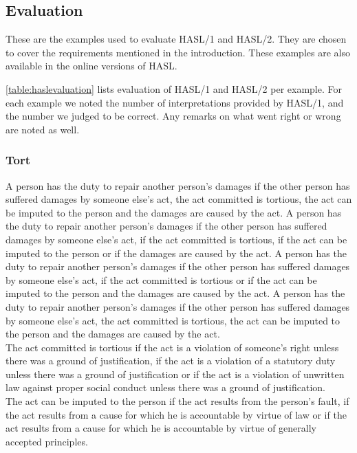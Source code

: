 \subsection{Evaluation}
\label{sec:appevaluation}
These are the examples used to evaluate HASL/1 and HASL/2. They are chosen to cover the requirements mentioned in the introduction. These examples are also available in the online versions of HASL.

\autoref{table:haslevaluation} lists evaluation of HASL/1 and HASL/2 per example. For each example we noted the number of interpretations provided by HASL/1, and the number we judged to be correct. Any remarks on what went right or wrong are noted as well.

\subsubsection{Tort}
\begin{exe}
\ex\label{e126} A person has the duty to repair another person's damages if the other person has suffered damages by someone else's act, the act committed is tortious, the act can be imputed to the person and the damages are caused by the act.
\ex\label{e127} A person has the duty to repair another person's damages if the other person has suffered damages by someone else's act, if the act committed is tortious, if the act can be imputed to the person or if the damages are caused by the act.
\ex\label{e128} A person has the duty to repair another person's damages if the other person has suffered damages by someone else's act, if the act committed is tortious or if the act can be imputed to the person and the damages are caused by the act.
\ex\label{e129} A person has the duty to repair another person's damages if the other person has suffered damages by someone else's act, the act committed is tortious, the act can be imputed to the person and the damages are caused by the act.\\ The act committed is tortious if the act is a violation of someone’s right unless there was a ground of justification, if the act is a violation of a statutory duty unless there was a ground of justification or if the act is a violation of unwritten law against proper social conduct unless there was a ground of justification.\\ The act can be imputed to the person if the act results from the person's fault, if the act results from a cause for which he is accountable by virtue of law or if the act results from a cause for which he is accountable by virtue of generally accepted principles.
\end{exe}

\clearpage